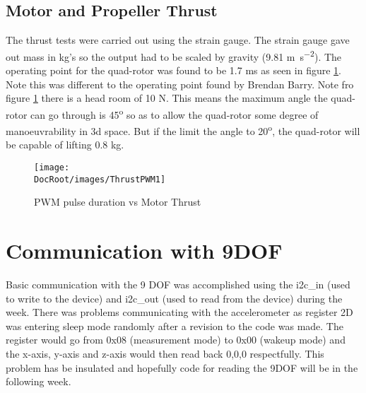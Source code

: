  \tocless\subsection{Motor and Propeller Thrust}
The thrust tests were carried out using the strain gauge. The strain gauge gave out mass in \si[mode = text]{\kilogram}'s so the output had to be scaled by gravity (9.81 \si[mode = text]{\meter \per  \square \second}).  The operating point for the quad-rotor was found to be 1.7 \si[mode =text]{\milli \second} as seen in figure \ref{Fig: Motor thrust graph}.  Note this was different to the operating point found by Brendan Barry. Note fro figure \ref{Fig: Motor thrust graph} there is a head room of 10 \si[mode = text ]{\newton}. This means the maximum angle the quad-rotor can go through is 45\textsuperscript{o} so as to allow the quad-rotor some degree of manoeuvrability in 3d space. But if the limit the angle to 20\textsuperscript{o}, the quad-rotor will be capable of lifting 0.8 \si[mode = text]{\kilogram}. 
\begin{figure}[h]
	\centering
	\texttt{[image: \\DocRoot/images/ThrustPWM1]}
	\caption{PWM pulse duration vs Motor Thrust}
	\label{Fig: Motor thrust graph}
\end{figure}

 \tocless\section{Communication with 9DOF}
Basic communication with the 9 DOF was accomplished using the i2c\_in (used to write to the device) and  i2c\_out (used to read from the device) during the week. There was problems communicating with the accelerometer as register 2D was entering sleep mode randomly after a revision to the code was made. The register would go from 0x08 (measurement mode) to 0x00 (wakeup mode) and the x-axis, y-axis and z-axis would then read back 0,0,0 respectfully. This problem has be insulated and hopefully code for reading the 9DOF will be in the following week.


